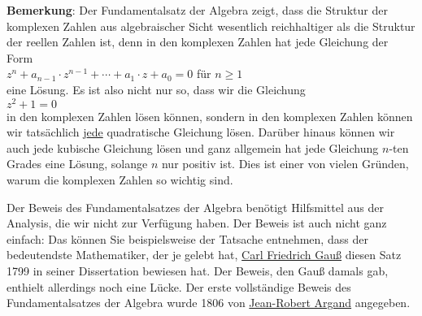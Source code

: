 \noindent
\textbf{Bemerkung}: Der Fundamentalsatz der Algebra zeigt, dass die Struktur der komplexen Zahlen
aus algebraischer Sicht wesentlich reichhaltiger als die Struktur der reellen Zahlen ist, denn in
den komplexen Zahlen hat jede Gleichung der Form
\\[0.2cm]
\hspace*{1.3cm}
$z^n + a_{n-1} \cdot z^{n-1} + \cdots + a_1 \cdot z + a_0 = 0$ \quad für $n \geq 1$
\\[0.2cm]
eine Lösung.  Es ist also nicht nur so, dass wir die Gleichung
\\[0.2cm]
\hspace*{1.3cm}
$z^2 + 1 = 0$
\\[0.2cm]
in den komplexen Zahlen lösen können, sondern in den komplexen Zahlen können wir tatsächlich
j\underline{ede} quadratische Gleichung lösen.  Darüber hinaus können wir auch jede kubische
Gleichung lösen und ganz allgemein hat jede Gleichung $n$-ten Grades eine Lösung, solange $n$ nur
positiv ist.  Dies ist einer von vielen Gründen, warum die komplexen Zahlen so wichtig sind.
\vspace*{0.2cm}

\noindent
Der Beweis des Fundamentalsatzes der Algebra benötigt Hilfsmittel aus der Analysis, die wir nicht
zur Verfügung haben.  Der Beweis ist auch nicht ganz einfach: Das können Sie beispielsweise der
Tatsache entnehmen, dass der bedeutendste Mathematiker, der je gelebt hat, 
\href{http://de.wikipedia.org/wiki/Carl_Friedrich_Gauss}{Carl Friedrich Gauß}
diesen Satz 1799 in seiner Dissertation bewiesen hat.  Der Beweis, den Gauß damals gab, enthielt
allerdings noch eine Lücke.  Der erste vollständige Beweis des Fundamentalsatzes der Algebra wurde 
1806 von \href{http://en.wikipedia.org/wiki/Jean-Robert_Argand}{Jean-Robert Argand} angegeben.

